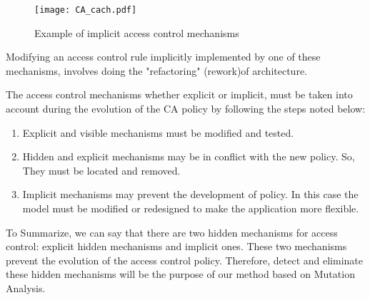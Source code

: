 \documentclass{acm_proc_article-sp}
\begin{document}
\begin{itemize}
\begin{figure}[h!]                                                       \centering                                                               \texttt{[image: CA\_cach.pdf]}              \caption{Example of implicit access control mechanisms}                  \label{Example of implicit access control mechanisms}                    \end{figure}                                                             

Modifying an access control rule implicitly implemented by one of these mechanisms, involves doing the "refactoring" (rework)of architecture.
\end{itemize}

The access control mechanisms whether explicit or implicit, must be taken into account during the evolution of the CA policy by following the steps noted below:
\begin{enumerate}
 \item Explicit and visible mechanisms must be modified and tested.
 \item Hidden and explicit mechanisms may be in conflict with the new policy. So, They must be located and removed.
 \item Implicit mechanisms may prevent the development of policy. In this case the model must be modified or redesigned to make the application more flexible.
\end{enumerate}
To Summarize, we can say that there are two hidden mechanisms for access control: explicit hidden mechanisms and implicit ones. These two mechanisms prevent the evolution of the access control policy. Therefore, detect and eliminate these hidden mechanisms will be the purpose of our method based on Mutation Analysis.
\end{document}
